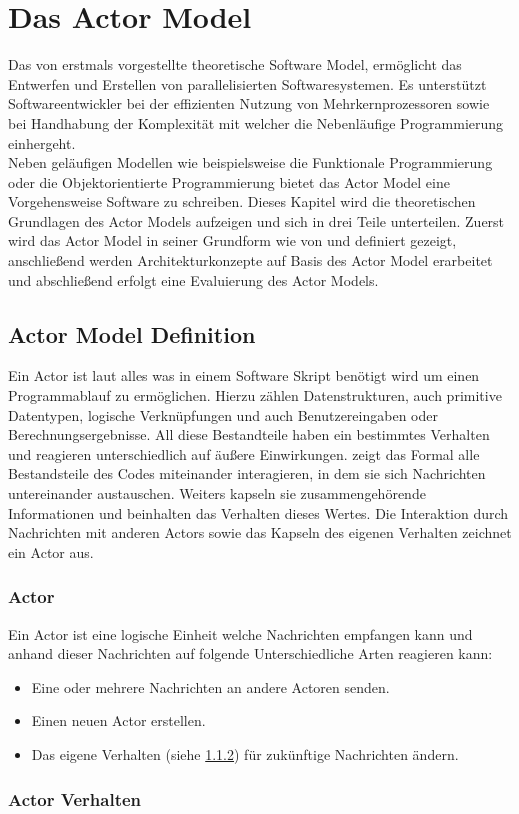 \chapter{Das Actor Model}
Das von \cite{hewitt1973session} erstmals vorgestellte theoretische Software Model, ermöglicht das Entwerfen und Erstellen von parallelisierten Softwaresystemen. Es unterstützt Softwareentwickler bei der effizienten Nutzung von Mehrkernprozessoren sowie bei Handhabung der  Komplexität mit welcher die Nebenläufige Programmierung einhergeht.   
\\
Neben geläufigen Modellen wie beispielsweise die Funktionale Programmierung oder die Objektorientierte Programmierung bietet das Actor Model eine Vorgehensweise Software zu schreiben. Dieses Kapitel wird die theoretischen Grundlagen des Actor Models aufzeigen und sich in drei Teile unterteilen. Zuerst wird das Actor Model in seiner Grundform wie von \cite{hewitt1973session} und \cite{Agha1985ActorsSystems} definiert gezeigt, anschließend werden Architekturkonzepte auf Basis des Actor Model erarbeitet und abschließend erfolgt eine Evaluierung des Actor Models.

\section{Actor Model Definition}
Ein Actor ist laut \cite{hewitt1973session} alles was in einem Software Skript benötigt wird um einen Programmablauf zu ermöglichen. Hierzu zählen Datenstrukturen, auch primitive Datentypen, logische Verknüpfungen und auch Benutzereingaben oder Berechnungsergebnisse. 
All diese Bestandteile haben ein bestimmtes Verhalten und reagieren unterschiedlich auf äußere Einwirkungen.
\cite{hewitt1973session} zeigt das Formal alle Bestandsteile des Codes miteinander interagieren, in dem sie sich Nachrichten untereinander austauschen.  Weiters kapseln sie zusammengehörende Informationen und beinhalten das Verhalten dieses Wertes. Die Interaktion durch Nachrichten mit anderen Actors sowie das Kapseln des eigenen Verhalten zeichnet ein Actor aus.

\subsection{Actor}
Ein Actor ist eine logische Einheit welche Nachrichten empfangen kann und anhand dieser Nachrichten auf folgende Unterschiedliche Arten reagieren kann:
\begin{itemize}
    \item Eine oder mehrere Nachrichten an andere Actoren senden.
    \item Einen neuen Actor erstellen.
    \item Das eigene Verhalten (siehe \ref{actorBehaviour}) für zukünftige Nachrichten ändern.
\end{itemize}

\subsection{Actor Verhalten}
\label{actorBehaviour}
\subsection{}
